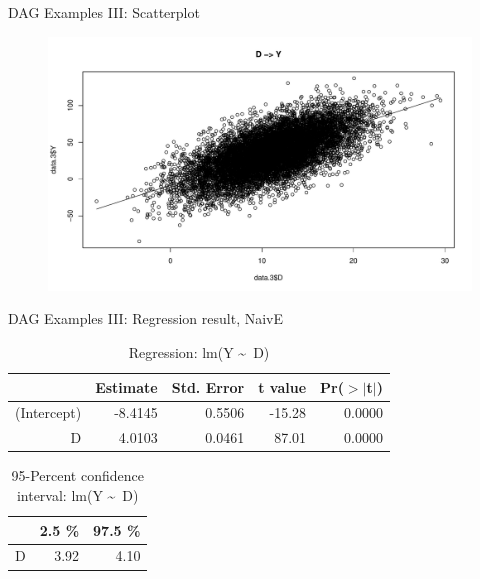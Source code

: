 \documentclass{beamer}\usepackage[]{graphicx}\usepackage[]{xcolor}
\makeatletter
\def\maxwidth{ %
  \ifdim\Gin@nat@width>\linewidth
    \linewidth
  \else
    \Gin@nat@width
  \fi
}
\newenvironment{knitrout}{}{} %
\makeatother
\begin{document}
\begin{frame}{DAG Examples III: Scatterplot}
\begin{figure}
\begin{knitrout}
\color{fgcolor}
\includegraphics[width=\maxwidth]{figure/ExamplesIIIScatterplot-1} 
\end{knitrout}
\end{figure}
\end{frame}


\begin{frame}[fragile]{DAG Examples III: Regression result, NaivE}
\begin{table}[ht]
\centering
\begingroup\small
\begin{tabular}{rrrrr}
  \hline
 & Estimate & Std. Error & t value & Pr($>$$|$t$|$) \\ 
  \hline
(Intercept) & -8.4145 & 0.5506 & -15.28 & 0.0000 \\ 
  D & 4.0103 & 0.0461 & 87.01 & 0.0000 \\ 
   \hline
\end{tabular}
\endgroup
\caption{Regression: lm(Y \textasciitilde ~D)} 
\end{table}
\begin{table}[ht]
\centering
\begingroup\small
\begin{tabular}{rrr}
  \hline
 & 2.5 \% & 97.5 \% \\ 
  \hline
D & 3.92 & 4.10 \\ 
   \hline
\end{tabular}
\endgroup
\caption{95-Percent confidence interval: lm(Y \textasciitilde ~D)} 
\end{table}

\end{frame}
\end{document}
